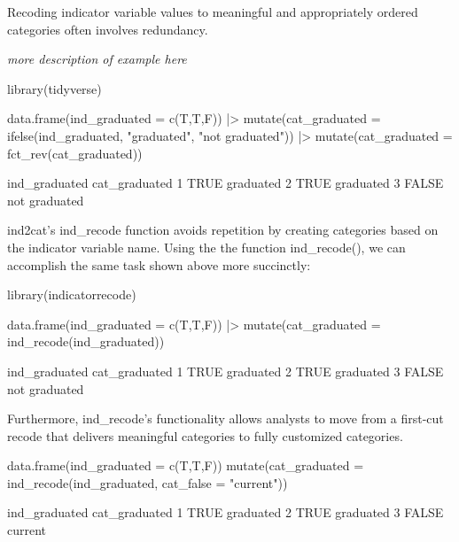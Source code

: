 Recoding indicator variable values to meaningful and appropriately
ordered categories often involves redundancy.

\emph{more description of example here}

\begin{Schunk}
\begin{Sinput}
library(tidyverse)

data.frame(ind_graduated = c(T,T,F)) |>
  mutate(cat_graduated  = ifelse(ind_graduated, 
                                 "graduated", 
                                 "not graduated")) |>
  mutate(cat_graduated = fct_rev(cat_graduated))  
\end{Sinput}
\begin{Soutput}
       ind_graduated cat_graduated
     1          TRUE     graduated
     2          TRUE     graduated
     3         FALSE not graduated
\end{Soutput}
\end{Schunk}

ind2cat's ind\_recode function avoids repetition by creating categories
based on the indicator variable name. Using the the function
ind\_recode(), we can accomplish the same task shown above more
succinctly:

\begin{Schunk}
\begin{Sinput}
library(indicatorrecode)

data.frame(ind_graduated = c(T,T,F)) |>
  mutate(cat_graduated  = ind_recode(ind_graduated))
\end{Sinput}
\begin{Soutput}
       ind_graduated cat_graduated
     1          TRUE     graduated
     2          TRUE     graduated
     3         FALSE not graduated
\end{Soutput}
\end{Schunk}

Furthermore, ind\_recode's functionality allows analysts to move from a
first-cut recode that delivers meaningful categories to fully customized
categories.

\begin{Schunk}
\begin{Sinput}
data.frame(ind_graduated = c(T,T,F)) %
  mutate(cat_graduated  = ind_recode(ind_graduated, 
                                     cat_false = "current"))
\end{Sinput}
\begin{Soutput}
       ind_graduated cat_graduated
     1          TRUE     graduated
     2          TRUE     graduated
     3         FALSE       current
\end{Soutput}
\end{Schunk}


